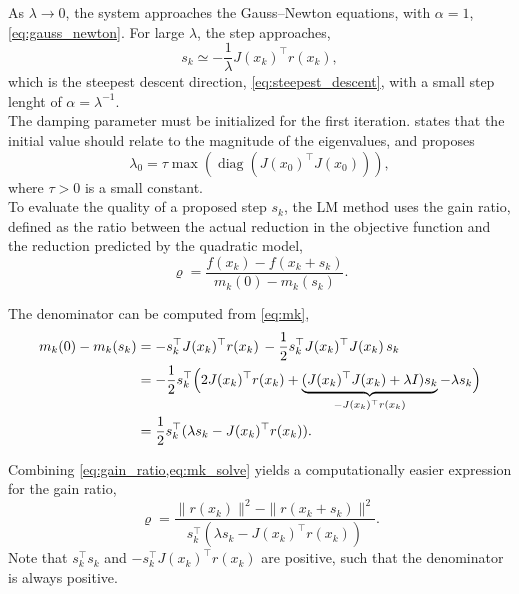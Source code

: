 As $\lambda \to 0$, the system approaches the Gauss--Newton equations, with $\alpha = 1$, \cref{eq:gauss_newton}. For large $\lambda$, the step approaches,
\begin{equation*}
    s_k \simeq -\frac{1}{\lambda}J(x_k)^\top r(x_k),
\end{equation*}
which is the steepest descent direction, \cref{eq:steepest_descent}, with a small step lenght of $\alpha=\lambda^{-1}$.\\

The damping parameter must be initialized for the first iteration. \cite{nielsen1999} states that the initial value should relate to the magnitude of the eigenvalues, and proposes
\begin{equation} \label{eq:init_lambda}
\lambda_0 = \tau \max \left( \operatorname{diag}(J(x_0)^\top J(x_0)) \right),
\end{equation}
where $\tau > 0$ is a small constant.\\

To evaluate the quality of a proposed step $s_k$, the LM method uses the gain ratio, defined as the ratio between the actual reduction in the objective function and the reduction predicted by the quadratic model,
\begin{equation}
\label{eq:gain_ratio}
\varrho =
\frac{f(x_k) - f(x_k + s_k)}
     {m_k(0) - m_k(s_k)}.
\end{equation}

The denominator can be computed from \cref{eq:mk},
\begin{align}
    m_k(0)-m_k(s_k) &= -s_k^\top J(x_k)^\top r(x_k) \,  - \frac{1}{2} s_k^\top J(x_k)^\top J(x_k) \, s_k \notag \\
    &= -\frac{1}{2} s_k^\top \Big(
    2 J(x_k)^\top r(x_k) + 
    \underbrace{(J(x_k)^\top J(x_k)+\lambda I)s_k}_{-J(x_k)^\top r(x_k)} 
    -\lambda s_k \Big)\notag \\
    &= \frac{1}{2} s_k^\top (\lambda s_k-J(x_k)^\top r(x_k)) \label{eq:mk_solve}.
\end{align}

Combining \cref{eq:gain_ratio,eq:mk_solve} yields a computationally easier expression for the gain ratio,
\begin{equation}
    \label{eq:gain_ratio_solve}
    \varrho = \frac{\|r(x_k)\|^2 - \|r(x_k+s_k)\|^2}
    {s_k^\top (\lambda s_k-J(x_k)^\top r(x_k))}.
\end{equation}
Note that $s_k^\top s_k$ and $-s_k^\top J(x_k)^\top r(x_k)$ are positive, such that the denominator is always positive.\\

